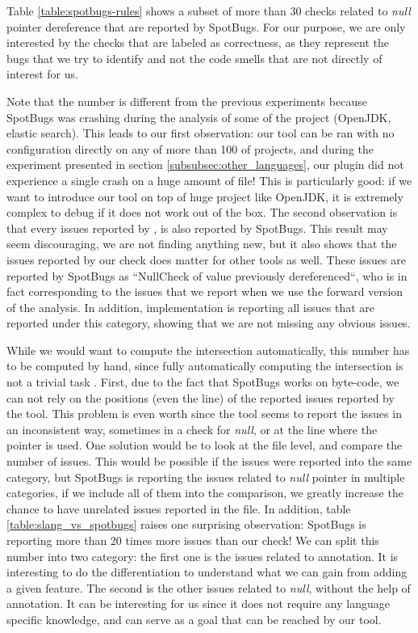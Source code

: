 Table \ref{table:spotbugs-rules} shows a subset of more than 30 checks related to \emph{null} pointer dereference that are reported by SpotBugs. 
For our purpose, we are only interested by the checks that are labeled as correctness, as they represent the bugs that we try to identify and not the code smells that are not directly of interest for us. 

Note that the number is different from the previous experiments because SpotBugs was crashing during the analysis of some of the project (OpenJDK, elastic search). 
This leads to our first observation: our tool can be ran with no configuration directly on any of more than 100 of projects, and during the experiment presented in section \ref{subsubsec:other_languages}, our plugin did not experience a single crash on a huge amount of file!
This is particularly good: if we want to introduce our tool on top of huge project like OpenJDK, it is extremely complex to debug if it does not work out of the box.
The second observation is that every issues reported by \slang{}, is also reported by SpotBugs. 
This result may seem discouraging, we are not finding anything new, but it also shows that the issues reported by our check does matter for other tools as well. 
These issues are reported by SpotBugs as “NullCheck of value previously dereferenced“, who is in fact corresponding to the issues that we report when we use the forward version of the analysis. 
In addition, \slang{} implementation is reporting all issues that are reported under this category, showing that we are not missing any obvious issues.

While we would want to compute the intersection automatically, this number has to be computed by hand, since fully automatically computing the intersection is not a trivial task \cite{Gabel:2010:OIE:1806799.1806806}. 
First, due to the fact that SpotBugs works on byte-code, we can not rely on the positions (even the line) of the reported issues reported by the tool. 
This problem is even worth since the tool seems to report the issues in an inconsistent way, sometimes in a check for \emph{null}, or at the line where the pointer is used. 
One solution would be to look at the file level, and compare the number of issues. 
This would be possible if the issues were reported into the same category, but SpotBugs is reporting the issues related to \emph{null} pointer in multiple categories, if we include all of them into the comparison, we greatly increase the chance to have unrelated issues reported in the file. \newline
In addition, table \ref{table:slang_vs_spotbugs} raises one surprising observation: SpotBugs is reporting more than 20 times more issues than our check!
We can split this number into two category: the first one is the issues related to annotation. 
It is interesting to do the differentiation to understand what we can gain from adding a given feature. 
The second is the other issues related to \emph{null}, without the help of annotation. 
It can be interesting for us since it does not require any language specific knowledge, and can serve as a goal that can be reached by our tool.


